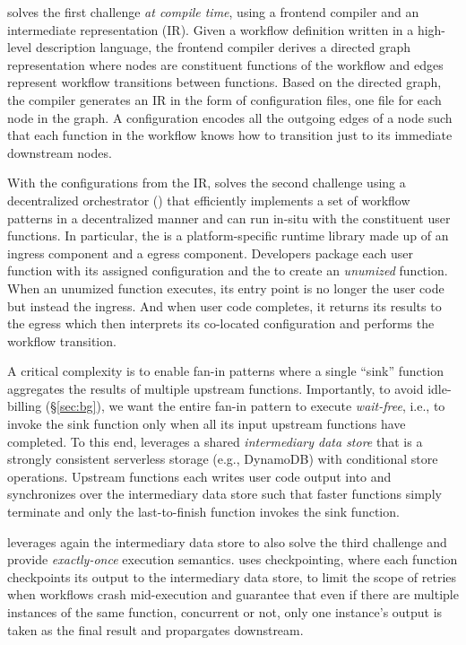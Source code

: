 \name{} solves the first challenge \emph{at compile time}, using a frontend
compiler and an intermediate representation (IR). Given a workflow definition
written in a high-level description language, the frontend compiler derives a
directed graph representation where nodes are constituent functions of the
workflow and edges represent workflow transitions between
functions. Based on the directed graph, the compiler generates an IR in
the form of configuration files, one file for each node in the graph. A
\name{} configuration encodes all the outgoing edges of a node such that each
function in the workflow knows how to transition just to its immediate
downstream nodes.

With the configurations from the IR, \name{} solves the second challenge using
a decentralized orchestrator (\deorc) that efficiently implements a set of
workflow patterns in a decentralized manner and can run in-situ with the
constituent user functions. In particular, the \deorc{} is a platform-specific
runtime library made up of an ingress component and a egress component.
Developers package each user function with its assigned \name{} configuration
and the \deorc{} to create an \emph{unumized} function. When an unumized
function executes, its entry point is no longer the user code but instead the
\deorc{} ingress. And when user code completes, it returns its results to the
\deorc{} egress which then interprets its co-located \name{} configuration and
performs the workflow transition.

A critical complexity is to enable fan-in patterns where a single ``sink''
function aggregates the results of multiple upstream functions. Importantly,
to avoid idle-billing (\S\ref{sec:bg}), we want the entire fan-in pattern to
execute \emph{wait-free}, i.e., to invoke the sink function only when all its
input upstream functions have completed. To this end, \name{} leverages a
shared \emph{intermediary data store} that is a strongly consistent serverless
storage (e.g., DynamoDB) with conditional store operations. Upstream functions
each writes user code output into and synchronizes over the intermediary data
store such that faster functions simply terminate and only the last-to-finish
function invokes the sink function.

\name{} leverages again the intermediary data store to also solve the third
challenge and provide \emph{exactly-once} execution semantics. \name{} uses
checkpointing, where each function checkpoints its output to the intermediary
data store, to limit the scope of retries when workflows crash mid-execution
and guarantee that even if there are multiple instances of the same function,
concurrent or not, only one instance's output is taken as the final result and
propargates downstream.


